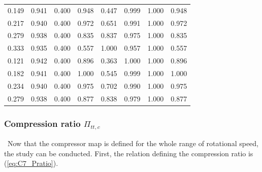 \begin{longtable}[c]{@{}cccc|cccc@{}}
0.149                            & 0.941                      & 0.400                 & 0.948                       & 0.447                            & 0.999                      & 1.000                 & 0.948                       \\
0.217                            & 0.940                      & 0.400                 & 0.972                       & 0.651                            & 0.991                      & 1.000                 & 0.972                       \\
0.279                            & 0.938                      & 0.400                 & 0.835                       & 0.837                            & 0.975                      & 1.000                 & 0.835                       \\
0.333                            & 0.935                      & 0.400                 & 0.557                       & 1.000                            & 0.957                      & 1.000                 & 0.557                       \\
0.121                            & 0.942                      & 0.400                 & 0.896                       & 0.363                            & 1.000                      & 1.000                 & 0.896                       \\
0.182                            & 0.941                      & 0.400                 & 1.000                       & 0.545                            & 0.999                      & 1.000                 & 1.000                       \\
0.234                            & 0.940                      & 0.400                 & 0.975                       & 0.702                            & 0.990                      & 1.000                 & 0.975                       \\
0.279                            & 0.938                      & 0.400                 & 0.877                       & 0.838                            & 0.979                      & 1.000                 & 0.877                       \\* \bottomrule
\end{longtable}
\subsubsection{Compression ratio $\Pi_{tt,c}$}
\quad\ Now that the compressor map is defined for the whole range of rotational speed, the study can be conducted. First, the relation defining the compression ratio is (\ref{eq:C7_Pratio}).

